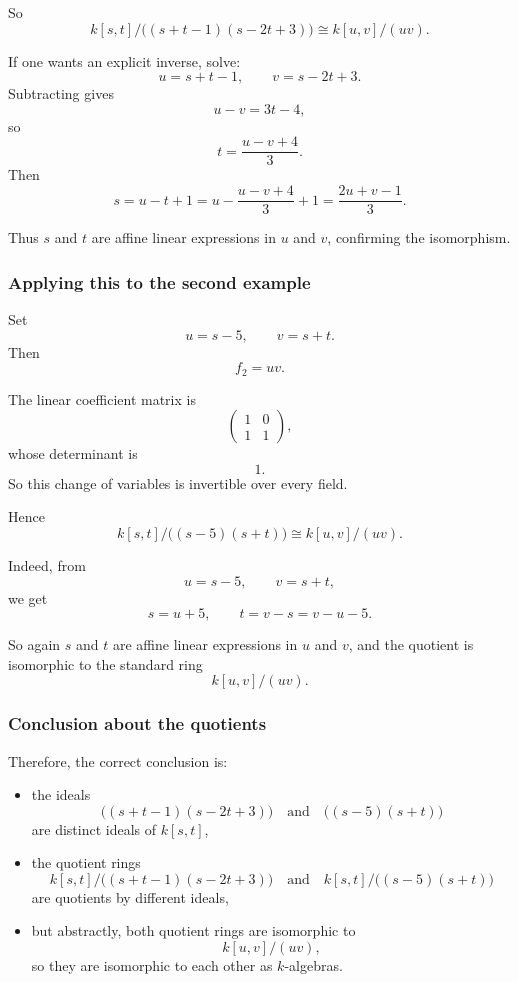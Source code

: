 \documentclass[12pt,a4paper]{article}
\theoremstyle{notespace}
\theoremstyle{definition}
\begin{document}
So
\[
k[s,t]/\bigl((s+t-1)(s-2t+3)\bigr)\cong k[u,v]/(uv).
\]

If one wants an explicit inverse, solve:
\[
u=s+t-1,
\qquad
v=s-2t+3.
\]
Subtracting gives
\[
u-v=3t-4,
\]
so
\[
t=\frac{u-v+4}{3}.
\]
Then
\[
s=u-t+1
= u-\frac{u-v+4}{3}+1
= \frac{2u+v-1}{3}.
\]

Thus \(s\) and \(t\) are affine linear expressions in \(u\) and \(v\), confirming the isomorphism.

\subsubsection{Applying this to the second example}

Set
\[
u=s-5,
\qquad
v=s+t.
\]
Then
\[
f_2=uv.
\]

The linear coefficient matrix is
\[
\begin{pmatrix}
	1 & 0\\
	1 & 1
\end{pmatrix},
\]
whose determinant is
\[
1.
\]
So this change of variables is invertible over every field.

Hence
\[
k[s,t]/\bigl((s-5)(s+t)\bigr)\cong k[u,v]/(uv).
\]

Indeed, from
\[
u=s-5,
\qquad
v=s+t,
\]
we get
\[
s=u+5,
\qquad
t=v-s=v-u-5.
\]

So again \(s\) and \(t\) are affine linear expressions in \(u\) and \(v\), and the quotient is isomorphic to the standard ring
\[
k[u,v]/(uv).
\]

\subsubsection{Conclusion about the quotients}

Therefore, the correct conclusion is:

\begin{itemize}
	\item the ideals
	\[
	\bigl((s+t-1)(s-2t+3)\bigr)
	\quad\text{and}\quad
	\bigl((s-5)(s+t)\bigr)
	\]
	are distinct ideals of \(k[s,t]\),
	
	\item the quotient rings
	\[
	k[s,t]/\bigl((s+t-1)(s-2t+3)\bigr)
	\quad\text{and}\quad
	k[s,t]/\bigl((s-5)(s+t)\bigr)
	\]
	are quotients by different ideals,
	
	\item but abstractly, both quotient rings are isomorphic to
	\[
	k[u,v]/(uv),
	\]
	so they are isomorphic to each other as \(k\)-algebras.
\end{itemize}
\end{document}
